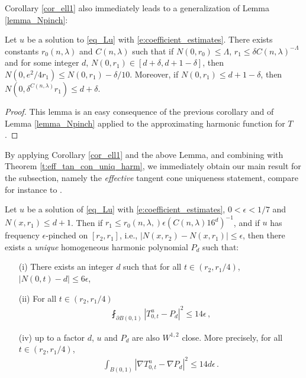 \documentclass[11pt]{article}
\begin{document}
Corollary \ref{cor_ell1} also immediately leads to a generalization of Lemma \ref{lemma_Npinch}:
\begin{lemma}\label{lemma_ellNpinch}
 Let $u$ be a solution to \eqref{eq_Lu} with \eqref{e:coefficient_estimates}. There exists constants $r_0(n,\lambda)$ and $C(n,\lambda)$ such that if $N(0,r_0)\leq \Lambda$, $r_1\leq \delta C(n,\lambda)^{-\Lambda}$ and for some integer $d$, $N(0,r_1)\in [d+\delta,d+1-\delta]$, then $N(0,e^2/4 r_1)\leq N(0,r_1)-\delta/10$. Moreover, if $N(0,r_1)\leq d+1-\delta$, then $N{\left({0,\delta^{C(n,\lambda)} r_1}\right)}\leq d+\delta$. 
\end{lemma}
\begin{proof}
 This lemma is an easy consequence of the previous corollary and of Lemma \ref{lemma_Npinch} applied to the approximating harmonic function for $T$. 
\end{proof}

By applying Corollary \ref{cor_ell1} and the above Lemma, and combining with Theorem \ref{t:eff_tan_con_uniq_harm}, we immediately obtain our main result for the subsection, namely the {\it effective} tangent cone uniqueness statement, compare for instance to \cite{hanlin}.

\begin{theorem}\label{t:eff_tan_con_uniq}
 Let $u$ be a solution of \eqref{eq_Lu} with \eqref{e:coefficient_estimates}, $0<\epsilon<1/7$ and $N(x,r_1)\leq d+1$.  Then if $r_1\leq r_0(n,\lambda,)\epsilon {\left({C(n,\lambda) 16^d}\right)}^{-1}$, and if $u$ has frequency $\epsilon$-pinched on $[r_2,r_1]$, i.e., ${\left|{N(x,r_2)-N(x,r_1)}\right|}\leq \epsilon$, then there exists a {\it unique} homogeneous harmonic polynomial $P_d$ such that:
\begin{enumerate}
  \item[(i)] There exists an integer $d$ such that for all $t\in (r_2,r_1/4)$, ${\left|{ N(0,t)-d}\right|}\leq 6\epsilon$,
  \item[(ii)] For all $t\in (r_2,r_1/4)$
   \begin{gather}
    \fint_{\partial B(0,1)} {\left|{T_{0,t}^u - P_d}\right|}^2 \leq 14\epsilon\, ,
   \end{gather}
  \item[(iv)] up to a factor $d$, $u$ and $P_d$ are also $W^{1,2}$ close. More precisely, for all $t\in (r_2,r_1/4)$,
     \begin{gather}
    \int_{B(0,1)} {\left|{\nabla T_{0,t}^u - \nabla P_d}\right|}^2\leq 14d\epsilon\, .
   \end{gather}
 \end{enumerate}
\end{theorem}
\end{document}
